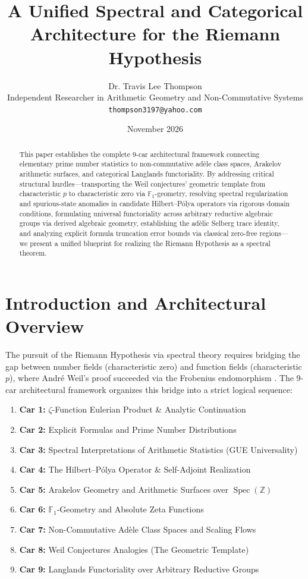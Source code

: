 \documentclass[11pt,a4paper]{article}
\title{A Unified Spectral and Categorical Architecture for the Riemann Hypothesis}
\author{Dr. Travis Lee Thompson \\ Independent Researcher in Arithmetic Geometry and Non-Commutative Systems \\ \texttt{thompson3197@yahoo.com}}
\date{November 2026}
\begin{document}
\maketitle

\begin{abstract}
This paper establishes the complete 9-car architectural framework connecting elementary prime number statistics to non-commutative ad\`{e}le class spaces, Arakelov arithmetic surfaces, and categorical Langlands functoriality. By addressing critical structural hurdles---transporting the Weil conjectures' geometric template from characteristic $p$ to characteristic zero via $\mathbb{F}_1$-geometry, resolving spectral regularization and spurious-state anomalies in candidate Hilbert--P\'{o}lya operators via rigorous domain conditions, formulating universal functoriality across arbitrary reductive algebraic groups via derived algebraic geometry, establishing the ad\`{e}lic Selberg trace identity, and analyzing explicit formula truncation error bounds via classical zero-free regions---we present a unified blueprint for realizing the Riemann Hypothesis as a spectral theorem.
\end{abstract}

\section{Introduction and Architectural Overview}
The pursuit of the Riemann Hypothesis via spectral theory requires bridging the gap between number fields (characteristic zero) and function fields (characteristic $p$), where Andr\'{e} Weil's proof succeeded via the Frobenius endomorphism \cite{Riemann1859, Edwards1974}. The 9-car architectural framework organizes this bridge into a strict logical sequence:
\begin{enumerate}
    \item \textbf{Car 1:} $\zeta$-Function Eulerian Product \& Analytic Continuation
    \item \textbf{Car 2:} Explicit Formulas and Prime Number Distributions
    \item \textbf{Car 3:} Spectral Interpretations of Arithmetic Statistics (GUE Universality)
    \item \textbf{Car 4:} The Hilbert--P\'{o}lya Operator \& Self-Adjoint Realization
    \item \textbf{Car 5:} Arakelov Geometry and Arithmetic Surfaces over $\operatorname{Spec}(\mathbb{Z})$
    \item \textbf{Car 6:} $\mathbb{F}_1$-Geometry and Absolute Zeta Functions
    \item \textbf{Car 7:} Non-Commutative Ad\`{e}le Class Spaces and Scaling Flows
    \item \textbf{Car 8:} Weil Conjectures Analogies (The Geometric Template)
    \item \textbf{Car 9:} Langlands Functoriality over Arbitrary Reductive Groups
\end{enumerate}
\end{document}
